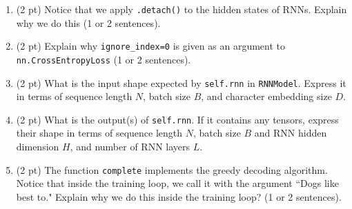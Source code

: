 \documentclass[a4paper,11pt]{article}
\begin{document}
\begin{enumerate}
\item (2 pt) Notice that we apply \texttt{.detach()} to the hidden states of RNNs. Explain why we do this (1 or 2 sentences).

\item (2 pt) Explain why \texttt{ignore\_index=0} is given as an argument to \texttt{nn.CrossEntropyLoss} (1 or 2 sentences).

\item (2 pt) What is the input shape expected by \texttt{self.rnn} in \texttt{RNNModel}. Express it in terms of sequence length $N$, batch size $B$, and character embedding size $D$.

\item (2 pt) What is the output(s) of \texttt{self.rnn}. If it contains any tensors, express their shape in terms of sequence length $N$, batch size $B$ and RNN hidden dimension $H$, and number of RNN layers $L$.

\item (2 pt) The function \texttt{complete} implements the greedy decoding algorithm. Notice that inside the training loop, we call it with the argument ``Dogs like best to." Explain why we do this inside the training loop? (1 or 2 sentences).
\end{enumerate}
\end{document}
